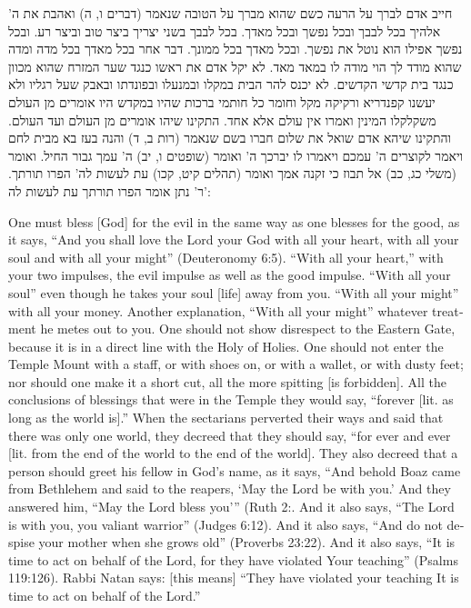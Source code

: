 \documentclass[12pt, openany]{book}
\newcommand{\textblock}[2]{
	{\fontsize{16pt}{20pt}\selectfont #1\\}
	
	\begin{english}
		#2
	\end{english}
	\clearpage
}
\begin{document}
\textblock{חייב אדם לברך על הרעה כשם שהוא מברך על הטובה שנאמר (דברים ו, ה) ואהבת את ה' אלהיך בכל לבבך ובכל נפשך ובכל מאדך. בכל לבבך בשני יצריך ביצר טוב וביצר רע. ובכל נפשך אפילו הוא נוטל את נפשך. ובכל מאדך בכל ממונך. דבר אחר בכל מאדך בכל מדה ומדה שהוא מודד לך הוי מודה לו במאד מאד. לא יקל אדם את ראשו כנגד שער המזרח שהוא מכוון כנגד בית קדשי הקדשים. לא יכנס להר הבית במקלו ובמנעלו ובפונדתו ובאבק שעל רגליו ולא יעשנו קפנדריא ורקיקה מקל וחומר כל חותמי ברכות שהיו במקדש היו אומרים מן העולם משקלקלו המינין ואמרו אין עולם אלא אחד. התקינו שיהו אומרים מן העולם ועד העולם. והתקינו שיהא אדם שואל את שלום חברו בשם שנאמר (רות ב, ד) והנה בעז בא מבית לחם ויאמר לקוצרים ה' עמכם ויאמרו לו יברכך ה' ואומר (שופטים ו, יב) ה' עמך גבור החיל. ואומר (משלי כג, כב) אל תבוז כי זקנה אמך ואומר (תהלים קיט, קכו) עת לעשות לה' הפרו תורתך. ר' נתן אומר הפרו תורתך עת לעשות לה': }{One must bless {[God]} for the evil in the same way as one blesses for the good, as it says, “And you shall love the Lord your God with all your heart, with all your soul and with all your might” (Deuteronomy 6:5). “With all your heart,” with your two impulses, the evil impulse as well as the good impulse. “With all your soul” even though he takes your soul {[life]} away from you. “With all your might” with all your money. Another explanation, “With all your might”  whatever treatment he metes out to you. One should not show disrespect to the Eastern Gate, because it is in a direct line with the Holy of Holies. One should not enter the Temple Mount with a staff, or with shoes on, or with a wallet, or with dusty feet; nor should one make it a short cut, all the more spitting {[is forbidden]}. All the conclusions of blessings that were in the Temple they would say, “forever {[lit. as long as the world is]}.” When the sectarians perverted their ways and said that there was only one world, they decreed that they should say, “for ever and ever {[lit. from the end of the world to the end of the world]}. They also decreed that a person should greet his fellow in God’s name, as it says, “And behold Boaz came from Bethlehem and said to the reapers, ‘May the Lord be with you.’ And they answered him, “May the Lord bless you’” (Ruth 2:. And it also says, “The Lord is with you, you valiant warrior” (Judges 6:12). And it also says, “And do not despise your mother when she grows old” (Proverbs 23:22). And it also says, “It is time to act on behalf of the Lord, for they have violated Your teaching” (Psalms 119:126). Rabbi Natan says: {[this means]} “They have violated your teaching It is time to act on behalf of the Lord.”}
\end{document}
